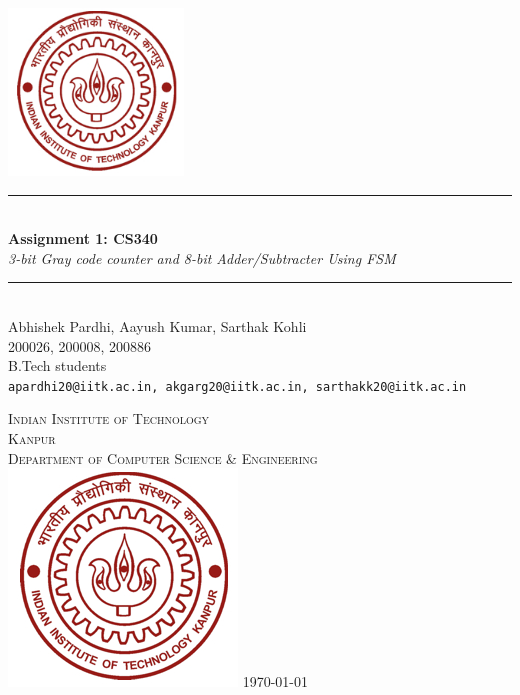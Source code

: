 \documentclass[12pt,a4paper]{article}
\newcommand{\HRule}{\rule{\linewidth}{0.5mm}}
\begin{document}
\begin{titlepage}
\begin{center}

\includegraphics[width=0.35\textwidth]{redlogo}~\\[1cm]


\HRule \\[0.4cm]
{ \LARGE 
  \textbf{Assignment 1: CS340}\\[0.4cm]
  \emph{3-bit Gray code counter and 8-bit Adder/Subtracter Using FSM}\\[0.4cm]
}
\HRule \\[1.5cm]



{ \large
  Abhishek Pardhi, Aayush Kumar, Sarthak Kohli\\[0.1cm]
  200026, 200008, 200886\\[0.1cm]
  B.Tech students\\[0.1cm]
  \texttt{apardhi20@iitk.ac.in, akgarg20@iitk.ac.in, sarthakk20@iitk.ac.in}
}

\vfill

\textsc{\Large Indian Institute of Technology\\Kanpur}\\[0.4cm]
\textsc{\large Department of Computer Science \& Engineering }\\[0.4cm]

\includegraphics[scale=1,bb=0 0 30 30]{redlogo.jpg}
{\large \today}
 
\end{center}
\end{titlepage}
\end{document}
